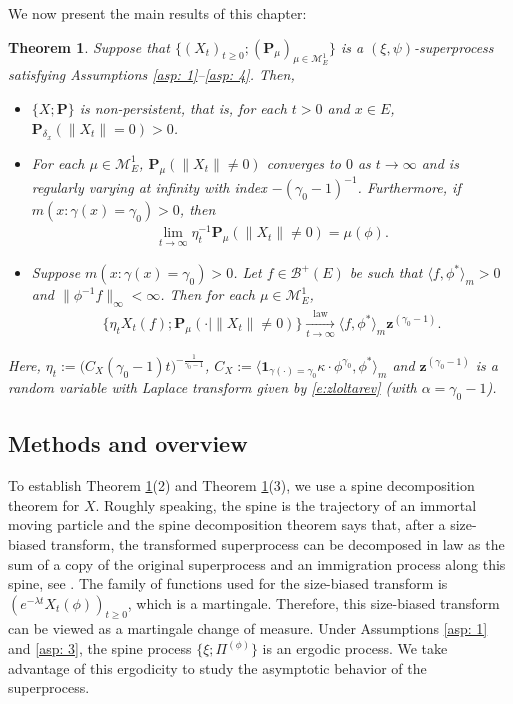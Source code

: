 \documentclass[UTF8]{pkuthss}
\theoremstyle{plain}
\newtheorem{thm}{Theorem}[section]
\theoremstyle{definition}
\numberwithin{equation}{section}
\begin{document}
	We now present the main results of this chapter:

\begin{thm} \label{thm: main theorem}
	Suppose that $\{(X_t)_{t\geq 0}; (\mathbf P_\mu)_{\mu \in \mathcal M_E^1}\}$ is a $(\xi, \psi)$-superprocess satisfying Assumptions \ref{asp: 1}--\ref{asp: 4}.
	Then,
\begin{itemize}
\item[(1)]
	$\{X; \mathbf P\}$ is non-persistent, that is, for each $t > 0$ and $x\in E$,
	$\mathbf P_{\delta_x}( \| X_t\| = 0) > 0$.
\item[(2)]
	For each $\mu \in \mathcal M^1_E$, $\mathbf P_{\mu}(\|X_t\| \neq 0)$ converges to
	$0$ as $t \to \infty$ and is regularly varying at infinity with index $-(\gamma_0-1)^{-1}$.
	Furthermore, if $m(x: \gamma (x)= \gamma_0)>0$, then
\begin{align}
	\lim_{t\to\infty} \eta_t^{-1}\mathbf P_{\mu}(\|X_t\| \neq 0)
	=\mu(\phi).
\end{align}
\item[(3)]
	Suppose $m( x:\gamma(x)=\gamma_0 )>0$.
	Let $f \in \mathscr B^+(E)$ be such that $\langle f, \phi^* \rangle_m > 0$ and $\| \phi^{-1}f \|_\infty < \infty$. Then for each $\mu \in \mathcal M_E^1$,
\begin{align}
	\{\eta_t X_t(f) ; \mathbf P_{\mu}(\cdot |\|X_t\| \neq 0) \}
	\xrightarrow[t\to \infty]{\operatorname{law}} \langle f, \phi^*\rangle_m \mathbf z^{(\gamma_0 - 1)}.
\end{align}
\end{itemize}
	Here, $\eta_t := \big( C_X(\gamma_0 - 1) t \big)^{- \frac {1} {\gamma_0 - 1} }$, $C_X := \langle \mathbf 1_{\gamma(\cdot) = \gamma_0} \kappa\cdot \phi^{\gamma_0}, \phi^* \rangle_m$ 
	and $\mathbf z^{(\gamma_0 - 1)}$ is a random variable with Laplace transform given by \eqref{e:zloltarev} 
	(with $\alpha=\gamma_0 -1$).

\end{thm}

\subsection{Methods and overview}
	
	To establish Theorem \ref{thm: main theorem}(2) and Theorem \ref{thm: main theorem}(3), we use a spine decomposition theorem for 	$X$.
	Roughly speaking, the spine is the trajectory of an immortal moving particle and the spine decomposition theorem says that, after a size-biased transform, the transformed superprocess can be decomposed in law as the sum of a copy of the original superprocess and an immigration process along this spine, see \cite{EckhoffKyprianouWinkel2015Spines, EnglanderKyprianou2004Local, LiuRenSong2009LlogL}.
	The family of functions used for the size-biased transform is $(e^{-\lambda t} X_t(\phi))_{t\geq 0}$, which is a martingale.
	Therefore, this size-biased transform can be viewed as a martingale change of measure.
	Under Assumptions \ref{asp: 1} and \ref{asp: 3}, the spine process $\{\xi; \Pi^{(\phi)}\}$ is an ergodic process.
	We take advantage of this ergodicity to study the asymptotic behavior of the superprocess.
	
\end{document}
